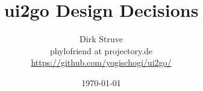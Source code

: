 \begin{titlepage}

\title{ui2go Design Decisions}

\author{Dirk Struve\\
phylofriend at projectory.de\\
\href{https://github.com/yogischogi/ui2go/}{https://github.com/yogischogi/ui2go/}}
\date{\today}
\end{titlepage}
\maketitle

